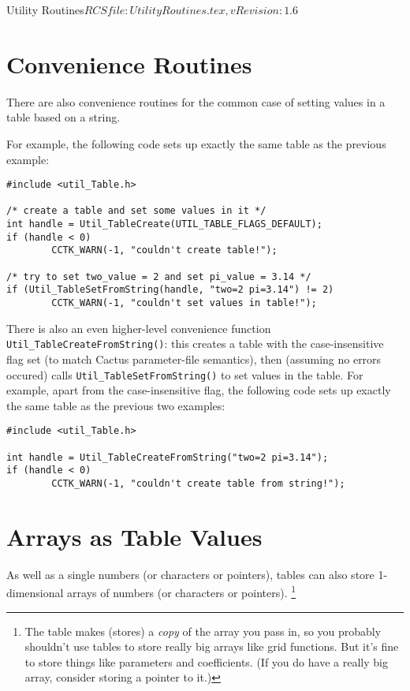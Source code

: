 \begin{cactuspart}{3}{Utility Routines}{$RCSfile: UtilityRoutines.tex,v $}{$Revision: 1.6 $}

\section{Convenience Routines}

There are also convenience routines for the common case of setting
values in a table based on a string.

For example, the following code sets up exactly the same table as the
previous example:

\begin{verbatim}
#include <util_Table.h>

/* create a table and set some values in it */
int handle = Util_TableCreate(UTIL_TABLE_FLAGS_DEFAULT);
if (handle < 0)
        CCTK_WARN(-1, "couldn't create table!");

/* try to set two_value = 2 and set pi_value = 3.14 */
if (Util_TableSetFromString(handle, "two=2 pi=3.14") != 2)
        CCTK_WARN(-1, "couldn't set values in table!");
\end{verbatim}

There is also an even higher-level convenience function
\verb|Util_TableCreateFromString()|: this creates a table with the
case-insensitive flag set (to match Cactus parameter-file semantics),
then (assuming no errors occured) calls \verb|Util_TableSetFromString()|
to set values in the table.  For example, apart from the case-insensitive
flag, the following code sets up exactly the same table as the
previous two examples:

\begin{verbatim}
#include <util_Table.h>

int handle = Util_TableCreateFromString("two=2 pi=3.14");
if (handle < 0)
        CCTK_WARN(-1, "couldn't create table from string!");
\end{verbatim}


\section{Arrays as Table Values}

As well as a single numbers (or characters or pointers), tables can
also store 1-dimensional arrays of numbers (or characters or pointers).%
\footnote{%
	 The table makes (stores) a {\em copy\/} of the array
	 you pass in, so you probably shouldn't use tables to
	 store really big arrays like grid functions.  But it's
	 fine to store things like parameters and coefficients.
	 (If you do have a really big array, consider storing
	 a pointer to it.)%
	 }%


\end{cactuspart}
